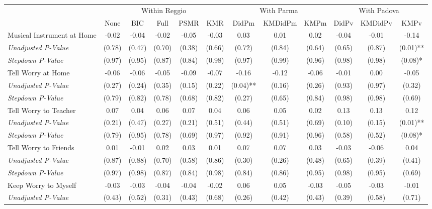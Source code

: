 \begin{tabular}{l c c c c c c c c c c c}
\toprule
& \multicolumn{5}{c}{Within Reggio} & \multicolumn{3}{c}{With Parma} & \multicolumn{3}{c}{With Padova} \\\cmidrule(lr){2-6} \cmidrule(lr){7-9} \cmidrule(lr){10-12}
 & None & BIC & Full & PSMR & KMR & DidPm & KMDidPm & KMPm & DidPv & KMDidPv & KMPv \\
\midrule
Musical Instrument at Home & -0.02 & -0.04 & -0.02 & -0.05 & -0.03 & 0.03 & 0.01 & 0.02 & -0.04 & -0.01 & -0.14 \\
\quad \textit{Unadjusted P-Value} & (0.78) & (0.47) & (0.70) & (0.38) & (0.66) & (0.72) & (0.84) & (0.64) & (0.65) & (0.87) & (0.01)** \\
\quad \textit{Stepdown P-Value} & (0.97) & (0.95) & (0.87) & (0.84) & (0.98) & (0.97) & (0.99) & (0.96) & (0.98) & (0.98) & (0.08)* \\
Tell Worry at Home & -0.06 & -0.06 & -0.05 & -0.09 & -0.07 & -0.16 & -0.12 & -0.06 & -0.01 & 0.00 & -0.05 \\
\quad \textit{Unadjusted P-Value} & (0.27) & (0.24) & (0.35) & (0.15) & (0.22) & (0.04)** & (0.16) & (0.26) & (0.93) & (0.97) & (0.32) \\
\quad \textit{Stepdown P-Value} & (0.79) & (0.82) & (0.78) & (0.68) & (0.82) & (0.27) & (0.65) & (0.84) & (0.98) & (0.98) & (0.69) \\
Tell Worry to Teacher & 0.07 & 0.04 & 0.06 & 0.07 & 0.04 & 0.06 & 0.05 & 0.02 & 0.13 & 0.13 & 0.12 \\
\quad \textit{Unadjusted P-Value} & (0.21) & (0.47) & (0.27) & (0.21) & (0.51) & (0.44) & (0.51) & (0.69) & (0.10) & (0.15) & (0.01)** \\
\quad \textit{Stepdown P-Value} & (0.79) & (0.95) & (0.78) & (0.69) & (0.97) & (0.92) & (0.91) & (0.96) & (0.58) & (0.52) & (0.08)* \\
Tell Worry to Friends & 0.01 & -0.01 & 0.02 & 0.03 & 0.01 & 0.07 & 0.07 & 0.03 & -0.03 & -0.06 & 0.04 \\
\quad \textit{Unadjusted P-Value} & (0.87) & (0.88) & (0.70) & (0.58) & (0.86) & (0.30) & (0.26) & (0.48) & (0.65) & (0.39) & (0.41) \\
\quad \textit{Stepdown P-Value} & (0.97) & (0.98) & (0.87) & (0.84) & (0.98) & (0.84) & (0.86) & (0.95) & (0.98) & (0.95) & (0.69) \\
Keep Worry to Myself & -0.03 & -0.03 & -0.04 & -0.04 & -0.02 & 0.06 & 0.05 & -0.03 & -0.05 & -0.03 & -0.01 \\
\quad \textit{Unadjusted P-Value} & (0.43) & (0.52) & (0.31) & (0.43) & (0.68) & (0.26) & (0.42) & (0.43) & (0.39) & (0.58) & (0.71) \\

\end{tabular}
